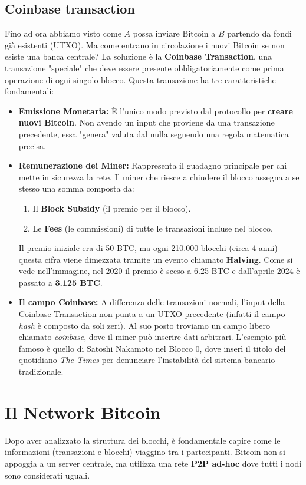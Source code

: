 \subsection{Coinbase transaction}
Fino ad ora abbiamo visto come $A$ possa inviare Bitcoin a $B$ partendo da fondi già esistenti (UTXO). Ma come entrano in circolazione i nuovi Bitcoin se non esiste una banca centrale? La soluzione è la \textbf{Coinbase Transaction}, una transazione "speciale" che deve essere presente obbligatoriamente come prima operazione di ogni singolo blocco. Questa transazione ha tre caratteristiche fondamentali:
\begin{itemize}
    \item \textbf{Emissione Monetaria:} È l'unico modo previsto dal protocollo per \textbf{creare nuovi Bitcoin}. Non avendo un input che proviene da una transazione precedente, essa "genera" valuta dal nulla seguendo una regola matematica precisa.
    \item \textbf{Remunerazione dei Miner:} Rappresenta il guadagno principale per chi mette in sicurezza la rete. Il miner che riesce a chiudere il blocco assegna a se stesso una somma composta da:
    \begin{enumerate}
        \item Il \textbf{Block Subsidy} (il premio per il blocco).
        \item Le \textbf{Fees} (le commissioni) di tutte le transazioni incluse nel blocco.
    \end{enumerate}
    Il premio iniziale era di 50 BTC, ma ogni 210.000 blocchi (circa 4 anni) questa cifra viene dimezzata tramite un evento chiamato \textbf{Halving}. Come si vede nell'immagine, nel 2020 il premio è sceso a 6.25 BTC e dall'aprile 2024 è passato a \textbf{3.125 BTC}.
    
    \item \textbf{Il campo Coinbase:} A differenza delle transazioni normali, l'input della Coinbase Transaction non punta a un UTXO precedente (infatti il campo \textit{hash} è composto da soli zeri). Al suo posto troviamo un campo libero chiamato \textit{coinbase}, dove il miner può inserire dati arbitrari. L'esempio più famoso è quello di Satoshi Nakamoto nel Blocco 0, dove inserì il titolo del quotidiano \textit{The Times} per denunciare l'instabilità del sistema bancario tradizionale.
\end{itemize}

\section{Il Network Bitcoin}
Dopo aver analizzato la struttura dei blocchi, è fondamentale capire come le informazioni (transazioni e blocchi) viaggino tra i partecipanti. Bitcoin non si appoggia a un server centrale, ma utilizza una rete \textbf{P2P ad-hoc} dove tutti i nodi sono considerati uguali.

